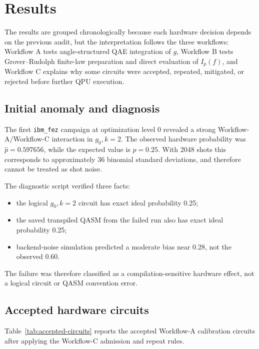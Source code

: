 \section{Results}
\label{sec:results}

The results are grouped chronologically because each hardware decision depends
on the previous audit, but the interpretation follows the three workflows:
Workflow A tests angle-structured QAE integration of \(g\), Workflow B tests
Grover--Rudolph finite-law preparation and direct evaluation of
\(I_p(f)\), and Workflow C explains why some circuits were accepted, repeated,
mitigated, or rejected before further QPU execution.

\subsection{Initial anomaly and diagnosis}

The first \texttt{ibm\_fez} campaign at optimization level 0 revealed a strong
Workflow-A/Workflow-C interaction in \(g_0,k=2\). The observed hardware
probability was
\(\hat{p}=0.597656\), while the expected value is \(p=0.25\). With 2048 shots
this corresponds to approximately 36 binomial standard deviations, and therefore
cannot be treated as shot noise.

The diagnostic script verified three facts:
\begin{itemize}[leftmargin=*]
  \item the logical \(g_0,k=2\) circuit has exact ideal probability 0.25;
  \item the saved transpiled QASM from the failed run also has exact ideal
        probability 0.25;
  \item backend-noise simulation predicted a moderate bias near 0.28, not the
        observed 0.60.
\end{itemize}
The failure was therefore classified as a compilation-sensitive hardware effect,
not a logical circuit or QASM convention error.

\subsection{Accepted hardware circuits}

Table~\ref{tab:accepted-circuits} reports the accepted Workflow-A calibration
circuits after applying the Workflow-C admission and repeat rules.

